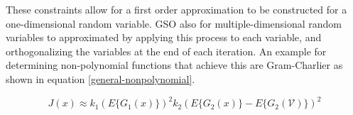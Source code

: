 \documentclass[12pt ]{article}
\begin{document}
These constraints allow for a first order approximation to be constructed for a one-dimensional random variable.  GSO also for multiple-dimensional random variables to approximated by applying this process to each variable, and orthogonalizing the variables at the end of each iteration.  An example for determining non-polynomial functions that achieve this are Gram-Charlier as shown in equation  \ref{general-nonpolynomial}.


\begin{equation}
J(x) \approx k_1 (E\{G_1 (x) \}  )^2  k_2 (E \{G_2(x) \} - E\{G_2 (\mathcal{V}) \})^2 \label{general-nonpolynomial}
\end{equation}






\end{document}
